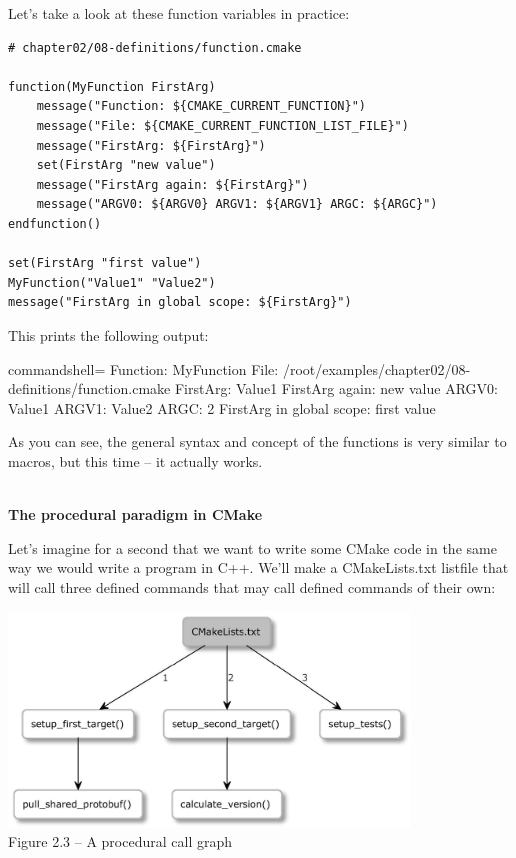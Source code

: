 Let's take a look at these function variables in practice:

\begin{lstlisting}[style=styleCMake]
# chapter02/08-definitions/function.cmake

function(MyFunction FirstArg)
	message("Function: ${CMAKE_CURRENT_FUNCTION}")
	message("File: ${CMAKE_CURRENT_FUNCTION_LIST_FILE}")
	message("FirstArg: ${FirstArg}")
	set(FirstArg "new value")
	message("FirstArg again: ${FirstArg}")
	message("ARGV0: ${ARGV0} ARGV1: ${ARGV1} ARGC: ${ARGC}")
endfunction()

set(FirstArg "first value")
MyFunction("Value1" "Value2")
message("FirstArg in global scope: ${FirstArg}")
\end{lstlisting}

This prints the following output:

\begin{tcblisting}{commandshell={}}
Function: MyFunction
File: /root/examples/chapter02/08-definitions/function.cmake
FirstArg: Value1
FirstArg again: new value
ARGV0: Value1 ARGV1: Value2 ARGC: 2
FirstArg in global scope: first value
\end{tcblisting}

As you can see, the general syntax and concept of the functions is very similar to macros, but this time – it actually works.

\hspace*{\fill} \\ %
\noindent
\textbf{The procedural paradigm in CMake}

Let's imagine for a second that we want to write some CMake code in the same way we would write a program in C++. We'll make a CMakeLists.txt listfile that will call three defined commands that may call defined commands of their own:

\begin{center}
\includegraphics[width=0.8\textwidth]{content/1/chapter2/images/3.jpg}\\
Figure 2.3 – A procedural call graph
\end{center}

